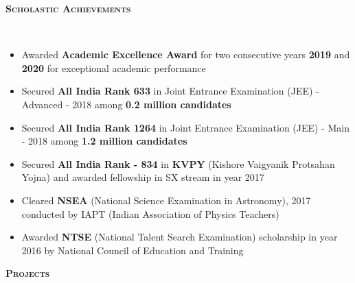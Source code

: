 \documentclass[9pt]{article}
\newenvironment{changemargin}[2]{%
  \begin{list}{}{%
    \setlength{\topsep}{2pt}%
    \setlength{\leftmargin}{#1}%
    \setlength{\rightmargin}{#2}%
    \setlength{\listparindent}{\parindent}%
    \setlength{\itemindent}{\parindent}%
    \setlength{\parsep}{\parskip}%
  }%
  \item[]}{\end{list}
}
\newcommand{\lineover}{
	\begin{changemargin}{0in}{0in}
		\vspace*{-18pt}
		\hrulefill \\
		\vspace*{-8pt}
	\end{changemargin}
}
\newcommand{\header}[1]{
	\begin{changemargin}{-0.5in}{-0.5in}
	\vspace{-4pt}
		\Large\bfseries\scshape{#1}\hrulefill
  	\lineover
	\end{changemargin}
}
\newenvironment{body} {
	\vspace*{-16pt}
	\begin{changemargin}{-0.4in}{-0.5in}
  }	
	{\end{changemargin}
}
\begin{document}
\vspace* {-1pt}
\header{Scholastic Achievements}
\begin{body}
	\vspace{18pt}
   
	\begin{itemize} \itemsep -1pt  %
        \itemindent=-1em
        \item Awarded \textbf{Academic Excellence Award} for two consecutive years \textbf{2019} and \textbf{2020} for exceptional academic performance
		\item Secured \textbf{All India Rank 633} in Joint Entrance Examination (JEE) - Advanced - 2018 among \textbf{0.2 million candidates}
		\item Secured \textbf{All India Rank 1264} in Joint Entrance Examination (JEE) - Main - 2018 among \textbf{1.2 million candidates}
		\item Secured \textbf{All India Rank - 834} in \textbf{KVPY} (Kishore Vaigyanik Protsahan Yojna) and awarded fellowship in SX stream in year 2017
		\item Cleared \textbf{NSEA} (National Science Examination in Astronomy), 2017 conducted by IAPT (Indian Association of Physics Teachers)
		\item Awarded \textbf{NTSE} (National Talent Search Examination) scholarship in year 2016 by National Council of Education and Training
	\end{itemize}
	\vspace{2pt}
\end{body}



\vspace*{-8pt}
\header{Projects}
\end{document}
